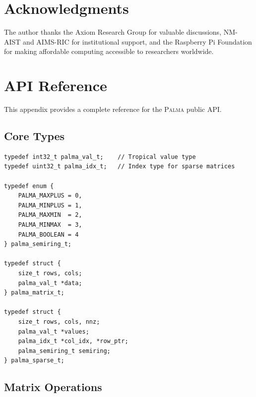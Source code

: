 \documentclass[11pt,a4paper]{article}
\theoremstyle{plain}
\theoremstyle{definition}
\newcommand{\palma}{\textsc{Palma}}
\begin{document}
\section*{Acknowledgments}

The author thanks the Axiom Research Group for valuable discussions, NM-AIST and AIMS-RIC for institutional support, and the Raspberry Pi Foundation for making affordable computing accessible to researchers worldwide.




\appendix

\section{API Reference}
\label{app:api}

This appendix provides a complete reference for the \palma{} public API.

\subsection{Core Types}

\begin{lstlisting}[caption={Core type definitions}]
typedef int32_t palma_val_t;    // Tropical value type
typedef uint32_t palma_idx_t;   // Index type for sparse matrices

typedef enum {
    PALMA_MAXPLUS = 0,
    PALMA_MINPLUS = 1,
    PALMA_MAXMIN  = 2,
    PALMA_MINMAX  = 3,
    PALMA_BOOLEAN = 4
} palma_semiring_t;

typedef struct {
    size_t rows, cols;
    palma_val_t *data;
} palma_matrix_t;

typedef struct {
    size_t rows, cols, nnz;
    palma_val_t *values;
    palma_idx_t *col_idx, *row_ptr;
    palma_semiring_t semiring;
} palma_sparse_t;
\end{lstlisting}

\subsection{Matrix Operations}
\end{document}
